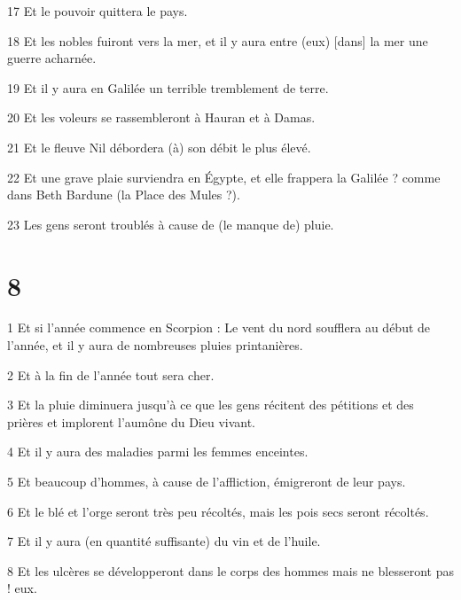 \par 17 Et le pouvoir quittera le pays.

\par 18 Et les nobles fuiront vers la mer, et il y aura entre (eux) [dans] la mer une guerre acharnée.

\par 19 Et il y aura en Galilée un terrible tremblement de terre.

\par 20 Et les voleurs se rassembleront à Hauran et à Damas.

\par 21 Et le fleuve Nil débordera (à) son débit le plus élevé.

\par 22 Et une grave plaie surviendra en Égypte, et elle frappera la Galilée ? comme dans Beth Bardune (la Place des Mules ?).

\par 23 Les gens seront troublés à cause de (le manque de) pluie.

\chapter{8}

\par 1 Et si l'année commence en Scorpion : Le vent du nord soufflera au début de l'année, et il y aura de nombreuses pluies printanières.

\par 2 Et à la fin de l'année tout sera cher.

\par 3 Et la pluie diminuera jusqu'à ce que les gens récitent des pétitions et des prières et implorent l'aumône du Dieu vivant.

\par 4 Et il y aura des maladies parmi les femmes enceintes.

\par 5 Et beaucoup d'hommes, à cause de l'affliction, émigreront de leur pays.

\par 6 Et le blé et l'orge seront très peu récoltés, mais les pois secs seront récoltés.

\par 7 Et il y aura (en quantité suffisante) du vin et de l'huile.

\par 8 Et les ulcères se développeront dans le corps des hommes mais ne blesseront pas ! eux.

